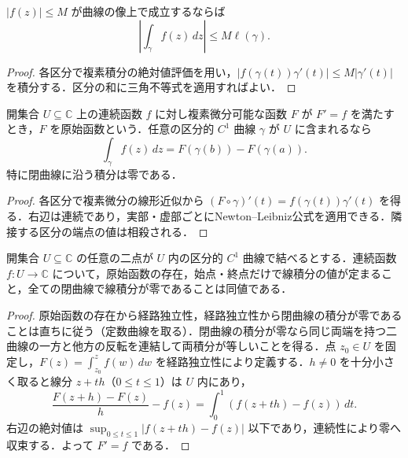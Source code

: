 \begin{prop}[線積分のML評価]
$|f(z)|\leq M$ が曲線の像上で成立するならば
\[
\left|\int_\gamma f(z)\,dz\right|\leq M\ell(\gamma).
\]

\end{prop}
\begin{proof}
各区分で複素積分の絶対値評価を用い，$|f(\gamma(t))\gamma'(t)|\leq M|\gamma'(t)|$ を積分する．区分の和に三角不等式を適用すればよい．
\end{proof}
\begin{prop}[原始函数を持つ函数の線積分]
開集合 $U\subseteq\mathbb C$ 上の連続函数 $f$ に対し複素微分可能な函数 $F$ が $F'=f$ を満たすとき，$F$ を原始函数という．任意の区分的 $C^1$ 曲線 $\gamma$ が $U$ に含まれるなら
\[
\int_\gamma f(z)\,dz=F(\gamma(b))-F(\gamma(a)).
\]
特に閉曲線に沿う積分は零である．
\end{prop}
\begin{proof}
各区分で複素微分の線形近似から $(F\circ\gamma)'(t)=f(\gamma(t))\gamma'(t)$ を得る．右辺は連続であり，実部・虚部ごとにNewton–Leibniz公式を適用できる．隣接する区分の端点の値は相殺される．
\end{proof}
\begin{prop}[積分経路の独立性と原始函数の存在]
開集合 $U\subseteq\mathbb C$ の任意の二点が $U$ 内の区分的 $C^1$ 曲線で結べるとする．連続函数 $f:U\to\mathbb C$ について，原始函数の存在，始点・終点だけで線積分の値が定まること，全ての閉曲線で線積分が零であることは同値である．
\end{prop}
\begin{proof}
原始函数の存在から経路独立性，経路独立性から閉曲線の積分が零であることは直ちに従う（定数曲線を取る）．閉曲線の積分が零なら同じ両端を持つ二曲線の一方と他方の反転を連結して両積分が等しいことを得る．点 $z_0\in U$ を固定し，$F(z)=\int_{z_0}^z f(w)\,dw$ を経路独立性により定義する．$h\ne0$ を十分小さく取ると線分 $z+th$（$0\leq t\leq1$）は $U$ 内にあり，
\[
\frac{F(z+h)-F(z)}h-f(z)=\int_0^1(f(z+th)-f(z))\,dt.
\]
右辺の絶対値は $\sup_{0\leq t\leq1}|f(z+th)-f(z)|$ 以下であり，連続性により零へ収束する．よって $F'=f$ である．
\end{proof}
